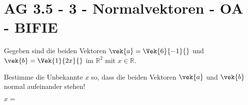 \section{AG 3.5 - 3 - Normalvektoren - OA - BIFIE}

\begin{beispiel}[AG 3.5]{1} %
Gegeben sind die beiden Vektoren $\vek{a}=\Vek{6}{-1}{}$ und $\vek{b}=\Vek{1}{2x}{}$ im $\mathbb{R}^2$ mit $x \in \mathbb{R}$.

\leer

Bestimme die Unbekannte $x$ so, dass die beiden Vektoren $\vek{a}$ und $\vek{b}$ normal aufeinander stehen!

\leer

$x=$ 

\end{beispiel}